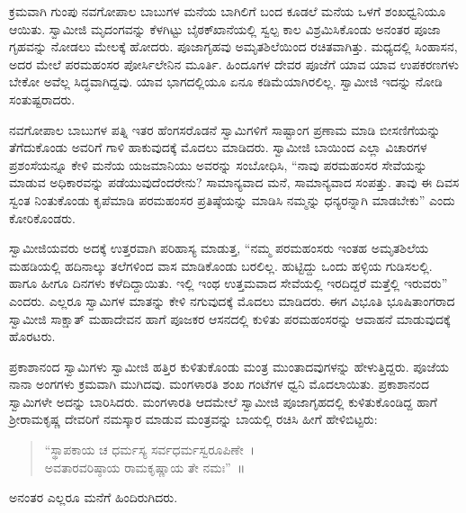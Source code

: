  ಕ್ರಮವಾಗಿ ಗುಂಪು ನವಗೋಪಾಲ ಬಾಬುಗಳ ಮನೆಯ ಬಾಗಿಲಿಗೆ ಬಂದ ಕೂಡಲೆ ಮನೆಯ ಒಳಗೆ ಶಂಖಧ್ವನಿಯೂ ಆಯಿತು. ಸ್ವಾಮೀಜಿ ಮೃದಂಗವನ್ನು ಕೆಳಗಿಟ್ಟು ಬೈಠಕ್‍ಖಾನೆಯಲ್ಲಿ ಸ್ವಲ್ಪ ಕಾಲ ವಿಶ್ರಮಿಸಿಕೊಂಡು ಅನಂತರ ಪೂಜಾ ಗೃಹವನ್ನು ನೋಡಲು ಮೇಲಕ್ಕೆ ಹೋದರು. ಪೂಜಾಗೃಹವು ಅಮೃತಶಿಲೆಯಿಂದ ರಚಿತವಾಗಿತ್ತು. ಮಧ್ಯದಲ್ಲಿ ಸಿಂಹಾಸನ, ಅದರ ಮೇಲೆ ಪರಮಹಂಸರ ಪೋರ್ಸಿ‍‍ಲೇನಿನ ಮೂರ್ತಿ. ಹಿಂದೂಗಳ ದೇವರ ಪೂಜೆಗೆ ಯಾವ ಯಾವ ಉಪಕರಣಗಳು ಬೇಕೋ ಅವೆಲ್ಲ ಸಿದ್ಧವಾಗಿದ್ದವು. ಯಾವ ಭಾಗದಲ್ಲಿಯೂ ಏನೂ ಕಡಿಮೆಯಾಗಿರಲಿಲ್ಲ. ಸ್ವಾಮೀಜಿ ಇದನ್ನು ನೋಡಿ ಸಂತುಷ್ಟರಾದರು. 

 ನವಗೋಪಾಲ ಬಾಬುಗಳ ಪತ್ನಿ ಇತರ ಹೆಂಗಸರೊಡನೆ ಸ್ವಾಮಿಗಳಿಗೆ ಸಾಷ್ಟಾಂಗ ಪ್ರಣಾಮ ಮಾಡಿ ಬೀಸಣಿಗೆಯನ್ನು ತೆಗೆದುಕೊಂಡು ಅವರಿಗೆ ಗಾಳಿ ಹಾಕುವುದಕ್ಕೆ ಮೊದಲು ಮಾಡಿದರು. ಸ್ವಾಮೀಜಿ ಬಾಯಿಂದ ಎಲ್ಲಾ ವಿಚಾರಗಳ ಪ್ರಶಂಸೆಯನ್ನೂ ಕೇಳಿ ಮನೆಯ ಯಜಮಾನಿಯು ಅವರನ್ನು ಸಂಬೋಧಿಸಿ, “ನಾವು ಪರಮಹಂಸರ ಸೇವೆಯನ್ನು ಮಾಡುವ ಅಧಿಕಾರವನ್ನು ಪಡೆಯುವುದೆಂದರೇನು? ಸಾಮಾನ್ಯವಾದ ಮನೆ, ಸಾಮಾನ್ಯವಾದ ಸಂಪತ್ತು. ತಾವು ಈ ದಿವಸ ಸ್ವಂತ ನಿಂತುಕೊಂಡು ಕೃಪೆಮಾಡಿ ಪರಮಹಂಸರ ಪ್ರತಿಷ್ಠೆಯನ್ನು ಮಾಡಿಸಿ ನಮ್ಮನ್ನು ಧನ್ಯರನ್ನಾಗಿ ಮಾಡಬೇಕು” ಎಂದು ಕೋರಿಕೊಂಡರು. 

 ಸ್ವಾಮೀಜಿಯವರು ಅದಕ್ಕೆ ಉತ್ತರವಾಗಿ ಪರಿಹಾಸ್ಯ ಮಾಡುತ್ತ, “ನಮ್ಮ ಪರಮಹಂಸರು ಇಂತಹ ಅಮೃತಶಿಲೆಯ ಮಹಡಿಯಲ್ಲಿ ಹದಿನಾಲ್ಕು ತಲೆಗಳಿಂದ ವಾಸ ಮಾಡಿಕೊಂಡು ಬರಲಿಲ್ಲ. ಹುಟ್ಟಿದ್ದು ಒಂದು ಹಳ್ಳಿಯ ಗುಡಿಸಲಲ್ಲಿ. ಹಾಗೂ ಹೀಗೂ ದಿನಗಳು ಕಳೆದಿದ್ದಾಯಿತು. ಇಲ್ಲಿ ಇಂಥ ಉತ್ತಮವಾದ ಸೇವೆಯಲ್ಲಿ ಇರದಿದ್ದರೆ ಮತ್ತೆಲ್ಲಿ ಇರುವರು” ಎಂದರು. ಎಲ್ಲರೂ ಸ್ವಾಮಿಗಳ ಮಾತನ್ನು ಕೇಳಿ ನಗುವುದಕ್ಕೆ ಮೊದಲು ಮಾಡಿದರು. ಈಗ ವಿಭೂತಿ ಭೂಷಿತಾಂಗರಾದ ಸ್ವಾಮೀಜಿ ಸಾಕ್ಷಾತ್ ಮಹಾದೇವನ ಹಾಗೆ ಪೂಜಕರ ಆಸನದಲ್ಲಿ ಕುಳಿತು ಪರಮಹಂಸರನ್ನು ಆವಾಹನೆ ಮಾಡುವುದಕ್ಕೆ ಹೊರಟರು. 

 ಪ್ರಕಾಶಾನಂದ ಸ್ವಾಮಿಗಳು ಸ್ವಾಮೀಜಿ ಹತ್ತಿರ ಕುಳಿತುಕೊಂಡು ಮಂತ್ರ ಮುಂತಾದವುಗಳನ್ನು ಹೇಳುತ್ತಿದ್ದರು. ಪೂಜೆಯ ನಾನಾ ಅಂಗಗಳು ಕ್ರಮವಾಗಿ ಮುಗಿದವು. ಮಂಗಳಾರತಿ ಶಂಖ ಗಂಟೆಗಳ ಧ್ವನಿ ಮೊದಲಾಯಿತು. ಪ್ರಕಾಶಾನಂದ ಸ್ವಾಮಿಗಳೇ ಅದನ್ನು ಬಾರಿಸಿದರು. ಮಂಗಳಾರತಿ ಆದಮೇಲೆ ಸ್ವಾಮೀಜಿ ಪೂಜಾಗೃಹದಲ್ಲಿ ಕುಳಿತುಕೊಂಡಿದ್ದ ಹಾಗೆ ಶ‍್ರೀರಾಮಕೃಷ್ಣ ದೇವರಿಗೆ ನಮಸ್ಕಾರ ಮಾಡುವ ಮಂತ್ರವನ್ನು ಬಾಯಲ್ಲಿ ರಚಿಸಿ ಹೀಗೆ ಹೇಳಿಬಿಟ್ಟರು:

\begin{verse}
“ಸ್ಥಾಪಕಾಯ ಚ ಧರ್ಮಸ್ಯ ಸರ್ವಧರ್ಮಸ್ವರೂಪಿಣೇ~। \\ಅವತಾರವರಿಷ್ಠಾಯ ರಾಮಕೃಷ್ಣಾಯ ತೇ ನಮಃ”~॥ 
\end{verse}

 ಅನಂತರ ಎಲ್ಲರೂ ಮನೆಗೆ ಹಿಂದಿರುಗಿದರು. 

